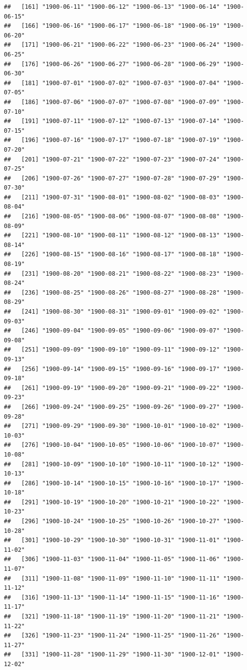 \documentclass{article}\usepackage[]{graphicx}\usepackage[]{color}
\makeatletter
\newenvironment{kframe}{%
 \def\at@end@of@kframe{}%
 \ifinner\ifhmode%
  \def\at@end@of@kframe{\end{minipage}}%
  \begin{minipage}{\columnwidth}%
 \fi\fi%
 \def\FrameCommand##1{\hskip\@totalleftmargin \hskip-\fboxsep
 \colorbox{shadecolor}{##1}\hskip-\fboxsep
     \hskip-\linewidth \hskip-\@totalleftmargin \hskip\columnwidth}%
 \MakeFramed {\advance\hsize-\width
   \@totalleftmargin\z@ \linewidth\hsize
   \@setminipage}}%
 {\par\unskip\endMakeFramed%
 \at@end@of@kframe}
\newenvironment{knitrout}{}{} %
\makeatother
\begin{document}
\begin{description}
\begin{knitrout}
\begin{kframe}
\begin{verbatim}
##   [161] "1900-06-11" "1900-06-12" "1900-06-13" "1900-06-14" "1900-06-15"
##   [166] "1900-06-16" "1900-06-17" "1900-06-18" "1900-06-19" "1900-06-20"
##   [171] "1900-06-21" "1900-06-22" "1900-06-23" "1900-06-24" "1900-06-25"
##   [176] "1900-06-26" "1900-06-27" "1900-06-28" "1900-06-29" "1900-06-30"
##   [181] "1900-07-01" "1900-07-02" "1900-07-03" "1900-07-04" "1900-07-05"
##   [186] "1900-07-06" "1900-07-07" "1900-07-08" "1900-07-09" "1900-07-10"
##   [191] "1900-07-11" "1900-07-12" "1900-07-13" "1900-07-14" "1900-07-15"
##   [196] "1900-07-16" "1900-07-17" "1900-07-18" "1900-07-19" "1900-07-20"
##   [201] "1900-07-21" "1900-07-22" "1900-07-23" "1900-07-24" "1900-07-25"
##   [206] "1900-07-26" "1900-07-27" "1900-07-28" "1900-07-29" "1900-07-30"
##   [211] "1900-07-31" "1900-08-01" "1900-08-02" "1900-08-03" "1900-08-04"
##   [216] "1900-08-05" "1900-08-06" "1900-08-07" "1900-08-08" "1900-08-09"
##   [221] "1900-08-10" "1900-08-11" "1900-08-12" "1900-08-13" "1900-08-14"
##   [226] "1900-08-15" "1900-08-16" "1900-08-17" "1900-08-18" "1900-08-19"
##   [231] "1900-08-20" "1900-08-21" "1900-08-22" "1900-08-23" "1900-08-24"
##   [236] "1900-08-25" "1900-08-26" "1900-08-27" "1900-08-28" "1900-08-29"
##   [241] "1900-08-30" "1900-08-31" "1900-09-01" "1900-09-02" "1900-09-03"
##   [246] "1900-09-04" "1900-09-05" "1900-09-06" "1900-09-07" "1900-09-08"
##   [251] "1900-09-09" "1900-09-10" "1900-09-11" "1900-09-12" "1900-09-13"
##   [256] "1900-09-14" "1900-09-15" "1900-09-16" "1900-09-17" "1900-09-18"
##   [261] "1900-09-19" "1900-09-20" "1900-09-21" "1900-09-22" "1900-09-23"
##   [266] "1900-09-24" "1900-09-25" "1900-09-26" "1900-09-27" "1900-09-28"
##   [271] "1900-09-29" "1900-09-30" "1900-10-01" "1900-10-02" "1900-10-03"
##   [276] "1900-10-04" "1900-10-05" "1900-10-06" "1900-10-07" "1900-10-08"
##   [281] "1900-10-09" "1900-10-10" "1900-10-11" "1900-10-12" "1900-10-13"
##   [286] "1900-10-14" "1900-10-15" "1900-10-16" "1900-10-17" "1900-10-18"
##   [291] "1900-10-19" "1900-10-20" "1900-10-21" "1900-10-22" "1900-10-23"
##   [296] "1900-10-24" "1900-10-25" "1900-10-26" "1900-10-27" "1900-10-28"
##   [301] "1900-10-29" "1900-10-30" "1900-10-31" "1900-11-01" "1900-11-02"
##   [306] "1900-11-03" "1900-11-04" "1900-11-05" "1900-11-06" "1900-11-07"
##   [311] "1900-11-08" "1900-11-09" "1900-11-10" "1900-11-11" "1900-11-12"
##   [316] "1900-11-13" "1900-11-14" "1900-11-15" "1900-11-16" "1900-11-17"
##   [321] "1900-11-18" "1900-11-19" "1900-11-20" "1900-11-21" "1900-11-22"
##   [326] "1900-11-23" "1900-11-24" "1900-11-25" "1900-11-26" "1900-11-27"
##   [331] "1900-11-28" "1900-11-29" "1900-11-30" "1900-12-01" "1900-12-02"

\end{verbatim}
\end{kframe}
\end{knitrout}
\end{description}
\end{document}
